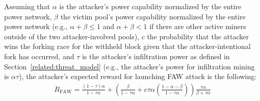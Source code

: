 Assuming that $\alpha$ is the attacker's power capability normalized by the entire power network,
$\beta$ the victim pool's power capability normalized by the entire power network (e.g., $\alpha+\beta \leq 1$ and $\alpha+\beta < 1$ if there are other active miners outside of the two attacker-involved pools),
$c$ the probability that the attacker wins the forking race for the withheld block given that the attacker-intentional fork has occurred,
and $\tau$ is the attacker's infiltration power as defined in Section~\ref{related:threat_model} (e.g., the attacker's power for infiltration mining is $\alpha \tau$),
the attacker's expected reward for launching FAW attack is the following:
\begin{eqnarray}
R_{\mbox{FAW}}=\frac{(1-\tau)\alpha}{1-\tau\alpha}+\left(\frac{\beta}{1-\tau\alpha}+c\tau\alpha\left(\frac{1-\alpha-\beta}{1-\tau\alpha}\right)\right)\frac{\tau\alpha}{\beta+\tau\alpha}
\label{eqn:reward_faw}
\end{eqnarray}


